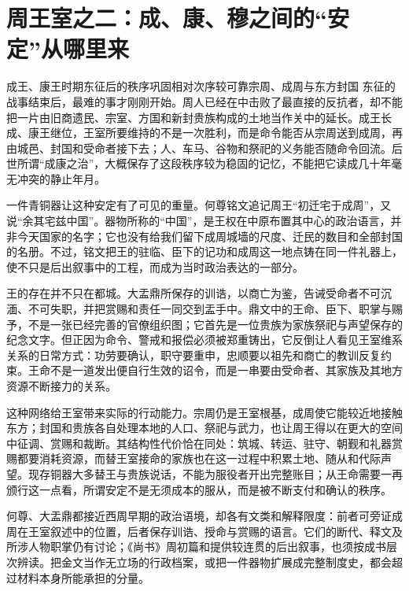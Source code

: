 \section{周王室之二：成、康、穆之间的“安定”从哪里来}

\begin{event}{成王、康王时期}{东征后的秩序巩固}{相对次序较可靠}{宗周、成周与东方封国}
东征的战事结束后，最难的事才刚刚开始。周人已经在中击败了最直接的反抗者，却不能把一片由旧商遗民、宗室、方国和新封贵族构成的土地当作关中的延长。成王长成、康王继位，王室所要维持的不是一次胜利，而是命令能否从宗周送到成周，再由城邑、封国和受命者接下去；人、车马、谷物和祭祀的义务能否随命令回流。后世所谓“成康之治”，大概保存了这段秩序较为稳固的记忆，不能把它读成几十年毫无冲突的静止年月。

一件青铜器让这种安定有了可见的重量。何尊铭文追记周王“初迁宅于成周”，又说“余其宅兹中国”。器物所称的“中国”，是王权在中原布置其中心的政治语言，并非今天国家的名字；它也没有给我们留下成周城墙的尺度、迁民的数目和全部封国的名册。不过，铭文把王的驻临、臣下的记功和成周这一地点铸在同一件礼器上，使不只是后出叙事中的工程，而成为当时政治表达的一部分。

王的存在并不只在都城。大盂鼎所保存的训诰，以商亡为鉴，告诫受命者不可沉湎、不可失职，并把赏赐和责任一同交到盂手中。鼎文中的王命、臣下、职掌与赐予，不是一张已经完善的官僚组织图；它首先是一位贵族为家族祭祀与声望保存的纪念文字。但正因为命令、警戒和报偿必须被郑重铸出，它反倒让人看见王室维系关系的日常方式：功劳要确认，职守要重申，忠顺要以祖先和商亡的教训反复约束。王命不是一道发出便自行生效的诏令，而是一串要由受命者、其家族及其地方资源不断接力的关系。

这种网络给王室带来实际的行动能力。宗周仍是王室根基，成周使它能较近地接触东方；封国和贵族各自处理本地的人口、祭祀与武力，也让周王得以在更大的空间中征调、赏赐和裁断。其结构性代价恰在同处：筑城、转运、驻守、朝觐和礼器赏赐都要消耗资源，而替王室接命的家族也在这一过程中积累土地、随从和代际声望。现存铜器大多替王与贵族说话，不能为服役者开出完整账目；从王命需要一再颁行这一点看，所谓安定不是无须成本的服从，而是被不断支付和确认的秩序。
\end{event}

\begin{sourcenote}
何尊、大盂鼎都接近西周早期的政治语境，却各有文类和解释限度：前者可旁证成周在王室叙述中的位置，后者保存训诰、授命与赏赐的语言。它们的断代、释文及所涉人物职掌仍有讨论；《尚书》周初篇和提供较连贯的后出叙事，也须按成书层次辨读。把金文当作无立场的行政档案，或把一件器物扩展成完整制度史，都会超过材料本身所能承担的分量。
\end{sourcenote}

